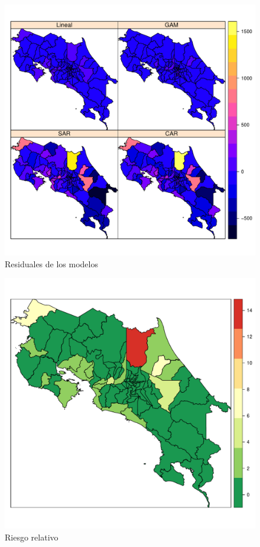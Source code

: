 \documentclass[12pt,a4paper]{article}
\begin{document}
\begin{figure}[hbtp]
\centering
\includegraphics[scale=0.75]{F4.pdf}
\caption{Residuales de los modelos}
\end{figure}

\begin{figure}[hbtp]
\centering
\includegraphics[scale=0.5]{F5.pdf}
\caption{Riesgo relativo}
\end{figure}
\end{document}
